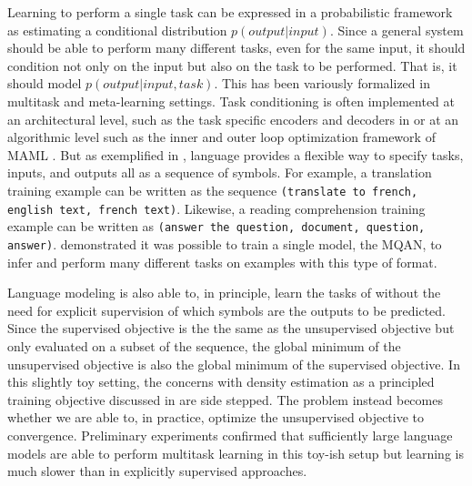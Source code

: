 \documentclass{article}
\begin{document}
Learning to perform a single task can be expressed in a probabilistic framework as estimating a conditional distribution $p(output | input)$. Since a general system should be able to perform many different tasks, even for the same input, it should condition not only on the input but also on the task to be performed. That is, it should model $p(output | input,task)$. This has been variously formalized in multitask and meta-learning settings. Task conditioning is often implemented at an architectural level, such as the task specific encoders and decoders in \cite{kaiser2017one} or at an algorithmic level such as the inner and outer loop optimization framework of MAML \cite{finn2017model}. But as exemplified in \citet{mccann2018natural}, language provides a flexible way to specify tasks, inputs, and outputs all as a sequence of symbols. For example, a translation training example can be written as the sequence \texttt{(translate to french, english text, french text)}. Likewise, a reading comprehension training example can be written as \texttt{(answer the question, document, question, answer)}. \citet{mccann2018natural} demonstrated it was possible to train a single model, the MQAN, to infer and perform many different tasks on examples with this type of format.

Language modeling is also able to, in principle, learn the tasks of \citet{mccann2018natural} without the need for explicit supervision of which symbols are the outputs to be predicted. Since the supervised objective is the the same as the unsupervised objective but only evaluated on a subset of the sequence, the global minimum of the unsupervised objective is also the global minimum of the supervised objective. In this slightly toy setting, the concerns with density estimation as a principled training objective discussed in \cite{sutskever2015towards} are side stepped. The problem instead becomes whether we are able to, in practice, optimize the unsupervised objective to convergence. Preliminary experiments confirmed that sufficiently large language models are able to perform multitask learning in this toy-ish setup but learning is much slower than in explicitly supervised approaches.

\end{document}
